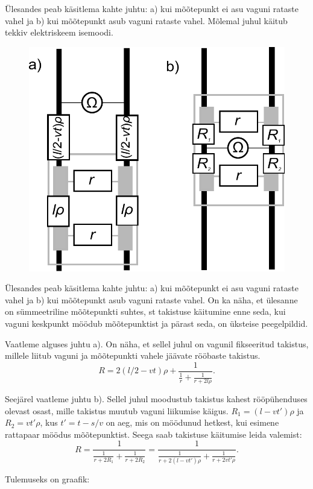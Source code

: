 \hint
Ülesandes peab käsitlema kahte juhtu: a) kui mõõtepunkt ei asu vaguni rataste vahel ja b) kui mõõtepunkt asub vaguni rataste vahel. Mõlemal juhul käitub tekkiv elektriskeem isemoodi.

\solu
\begin{figure}
\includegraphics[width=\linewidth]{2012-v2g-08-rong_lahendus}
\end{figure}
Ülesandes peab käsitlema kahte juhtu: a) kui mõõtepunkt ei asu vaguni rataste vahel ja b) kui mõõtepunkt asub vaguni rataste vahel. On ka näha, et ülesanne on sümmeetriline mõõtepunkti suhtes, st takistuse käitumine enne seda, kui vaguni keskpunkt möödub mõõtepunktist ja pärast seda, on üksteise peegelpildid.

Vaatleme alguses juhtu a). On näha, et sellel juhul on vagunil fikseeritud takistus, millele liitub vaguni ja mõõtepunkti vahele jäävate rööbaste takistus.
\[
R=2(l/2-vt)\rho+\frac{1}{\frac{1}{r}+\frac{1}{r+2l\rho}}.
\]

Seejärel vaatleme juhtu b). Sellel juhul moodustub takistus kahest rööpühenduses olevast osast, mille takistus muutub vaguni liikumise käigus. $R_1=(l-vt')\rho$ ja $R_2=vt'\rho$, kus $t'=t-s/v$ on aeg, mis on möödunud hetkest, kui esimene rattapaar möödus mõõtepunktist. Seega saab takistuse käitumise leida valemist:
\[
R=\frac{1}{\frac{1}{r+2R_1}+\frac{1}{r+2R_2}}=\frac{1}{\frac{1}{r+2(l-vt')\rho}+\frac{1}{r+2vt'\rho}}.
\]

Tulemuseks on graafik:

